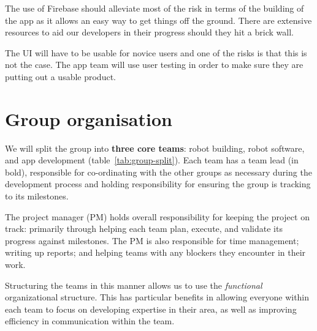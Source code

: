 \documentclass{article}
\begin{document}
The use of Firebase should alleviate most of the risk in terms of the building of the app as it allows an easy way to get things off the ground. There are extensive resources to aid our developers in their progress should they hit a brick wall.

The UI will have to be usable for novice users and one of the risks is that this is not the case. The app team will use user testing in order to make sure they are putting out a usable product.


\section{Group organisation}
\begin{table}[]
  \caption{Team splits across the group. Names in bold are key points of contact.}
  \label{tab:group-split}
\end{table}

We will split the group into {\bf three core teams}: robot building, robot software, and app development (table~\ref{tab:group-split}). Each team has a team lead (in bold), responsible for co-ordinating with the other groups as necessary during the development process and holding responsibility for ensuring the group is tracking to its milestones.

The project manager (PM) holds overall responsibility for keeping the project on track: primarily through helping each team plan, execute, and validate its progress against milestones. The PM is also responsible for time management; writing up reports; and helping teams with any blockers they encounter in their work.

Structuring the teams in this manner allows us to use the {\it functional} organizational structure. This has particular benefits in allowing everyone within each team to focus on developing expertise in their area, as well as improving efficiency in communication within the team.
\end{document}
